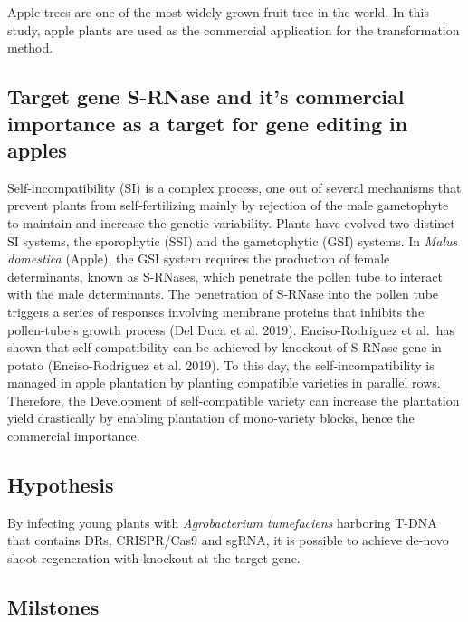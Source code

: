 \documentclass[
]{article}
\begin{document}
Apple trees are one of the most widely grown fruit tree in the world. In
this study, apple plants are used as the commercial application for the
transformation method.

\hypertarget{target-gene-s-rnase-and-its-commercial-importance-as-a-target-for-gene-editing-in-apples}{%
\subsection{Target gene S-RNase and it's commercial importance as a
target for gene editing in
apples}\label{target-gene-s-rnase-and-its-commercial-importance-as-a-target-for-gene-editing-in-apples}}

Self-incompatibility (SI) is a complex process, one out of several
mechanisms that prevent plants from self-fertilizing mainly by rejection
of the male gametophyte to maintain and increase the genetic
variability. Plants have evolved two distinct SI systems, the
sporophytic (SSI) and the gametophytic (GSI) systems. In \emph{Malus
domestica} (Apple), the GSI system requires the production of female
determinants, known as S-RNases, which penetrate the pollen tube to
interact with the male determinants. The penetration of S-RNase into the
pollen tube triggers a series of responses involving membrane proteins
that inhibits the pollen-tube's growth process (Del Duca et al. 2019).
Enciso-Rodriguez et al.~has shown that self-compatibility can be
achieved by knockout of S-RNase gene in potato (Enciso-Rodriguez et al.
2019). To this day, the self-incompatibility is managed in apple
plantation by planting compatible varieties in parallel rows. Therefore,
the Development of self-compatible variety can increase the plantation
yield drastically by enabling plantation of mono-variety blocks, hence
the commercial importance.

\hypertarget{hypothesis}{%
\subsection{Hypothesis}\label{hypothesis}}

By infecting young plants with \emph{Agrobacterium tumefaciens}
harboring T-DNA that contains DRs, CRISPR/Cas9 and sgRNA, it is possible
to achieve de-novo shoot regeneration with knockout at the target gene.

\hypertarget{milstones}{%
\subsection{Milstones}\label{milstones}}
\end{document}

